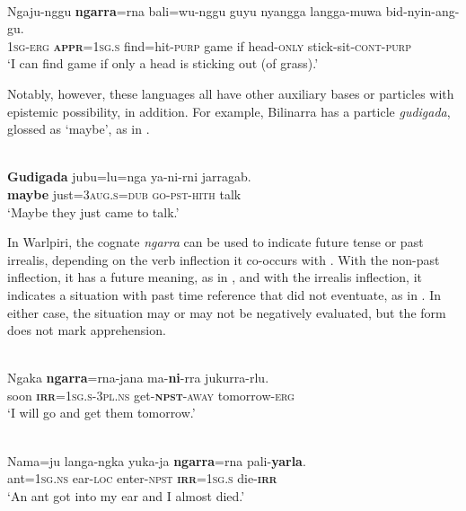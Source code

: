 \documentclass[output=paper,colorlinks,citecolor=brown]{langscibook}
\begin{document}
\ea
{} \\
\gll Ngaju-nggu \textbf{ngarra}=rna bali=wu-nggu guyu nyangga langga-muwa bid-nyin-ang-gu. \\
\textsc{1sg-erg} \textsc{\textbf{appr}=1sg.s} find=hit-\textsc{purp} game if head-\textsc{only} stick-sit-\textsc{cont-purp} \\
\glt `I can find game if only a head is sticking out (of grass).'
\label{ex:bro65}
\z

 Notably, however, these languages all have other auxiliary bases or particles with epistemic possibility, in addition. For example, Bilinarra has a particle \textit{gudigada}, glossed as `maybe', as in .

\ea 
{} \\
\gll \textbf{Gudigada} jubu=lu=nga ya-ni-rni jarragab. \\
\textbf{maybe} just=\textsc{3aug.s=dub} \textsc{go-pst-hith} talk \\
\glt `Maybe they just came to talk.'
\label{ex:bro66}
\z



In Warlpiri, the cognate \textit{ngarra} can be used to indicate future tense or past irrealis, depending on the verb inflection it co-occurs with \citep[788]{laughren_warlpiri-english_2007}. With the non-past inflection, it has a future meaning, as in , and with the irrealis inflection, it indicates a situation with past time reference that did not eventuate, as in . In either case, the situation may or may not be negatively evaluated, but the form does not mark apprehension.

\ea 
{} \\
\gll Ngaka \textbf{ngarra}=rna-jana ma-\textbf{ni}-rra jukurra-rlu. \\
soon \textsc{\textbf{irr}=1sg.s-3pl.ns} get-\textsc{\textbf{npst}-away} tomorrow-\textsc{erg} \\
\glt `I will go and get them tomorrow.'
\label{ex:bro67}
\z


\ea 
{} \\
\gll Nama=ju langa-ngka yuka-ja \textbf{ngarra}=rna pali-\textbf{yarla}. \\
ant=\textsc{1sg.ns} ear-\textsc{loc} enter-\textsc{npst} \textsc{\textbf{irr}=1sg.s} die-\textsc{\textbf{irr}} \\
\glt `An ant got into my ear and I almost died.'
\label{ex:bro68}
\z
\end{document}

